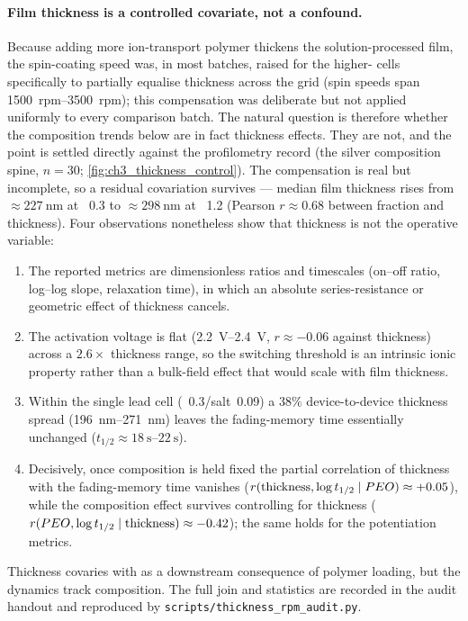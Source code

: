 \documentclass[12pt, twoside]{report}
\begin{document}
\paragraph{Film thickness is a controlled covariate, not a confound.} Because adding more ion-transport polymer thickens the solution-processed film, the spin-coating speed was, in most batches, raised for the higher-\PEO{} cells specifically to partially equalise thickness across the grid (spin speeds span \SIrange{1500}{3500}{rpm}); this compensation was deliberate but not applied uniformly to every comparison batch. The natural question is therefore whether the composition trends below are in fact thickness effects. They are not, and the point is settled directly against the profilometry record (the silver composition spine, \(n=30\); \cref{fig:ch3_thickness_control}). The compensation is real but incomplete, so a residual covariation survives --- median film thickness rises from \(\approx\SI{227}{\nano\meter}\) at \PEO{}~\num{0.3} to \(\approx\SI{298}{\nano\meter}\) at \PEO{}~\num{1.2} (Pearson \(r\approx0.68\) between \PEO{} fraction and thickness). Four observations nonetheless show that thickness is not the operative variable:
\begin{enumerate}
  \item The reported metrics are dimensionless ratios and timescales (on--off ratio, log--log slope, relaxation time), in which an absolute series-resistance or geometric effect of thickness cancels.
  \item The activation voltage is flat (\SIrange{2.2}{2.4}{\volt}, \(r\approx-0.06\) against thickness) across a \(2.6\times\) thickness range, so the switching threshold is an intrinsic ionic property rather than a bulk-field effect that would scale with film thickness.
  \item Within the single lead cell (\PEO{}~\num{0.3}/salt~\num{0.09}) a \(38\%\) device-to-device thickness spread (\SIrange{196}{271}{\nano\meter}) leaves the fading-memory time essentially unchanged (\(t_{1/2}\approx\SIrange{18}{22}{\second}\)).
  \item Decisively, once composition is held fixed the partial correlation of thickness with the fading-memory time vanishes (\(r(\text{thickness},\log t_{1/2}\mid PEO{})\approx+0.05\)), while the composition effect survives controlling for thickness (\(r(PEO{},\log t_{1/2}\mid\text{thickness})\approx-0.42\)); the same holds for the potentiation metrics.
\end{enumerate}
Thickness covaries with \PEO{} as a downstream consequence of polymer loading, but the dynamics track composition. The full join and statistics are recorded in the audit handout and reproduced by \texttt{scripts/\allowbreak thickness\_\allowbreak rpm\_\allowbreak audit.py}.
\end{document}
